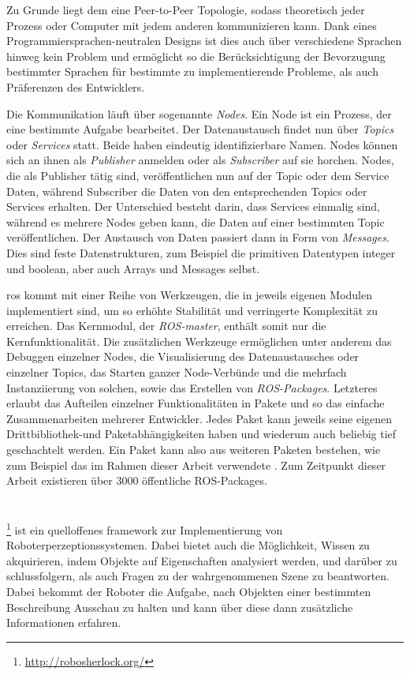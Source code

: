 Zu Grunde liegt dem eine Peer-to-Peer Topologie, sodass theoretisch jeder Prozess oder Computer mit jedem anderen kommunizieren kann. Dank eines Programmiersprachen-neutralen Designs ist dies auch über verschiedene Sprachen hinweg kein Problem und ermöglicht so die Berücksichtigung der Bevorzugung bestimmter Sprachen für bestimmte zu implementierende Probleme, als auch Präferenzen des Entwicklers.\par

Die Kommunikation läuft über sogenannte \textit{Nodes}. Ein Node ist ein Prozess, der eine bestimmte Aufgabe bearbeitet. Der Datenaustausch findet nun über \textit{Topics} oder \textit{Services} statt. Beide haben eindeutig identifizierbare Namen. Nodes können sich an ihnen als \textit{Publisher} anmelden oder als \textit{Subscriber} auf sie horchen. Nodes, die als Publisher tätig sind, veröffentlichen nun auf der Topic oder dem Service Daten, während Subscriber die Daten von den entsprechenden Topics oder Services erhalten. Der Unterschied besteht darin, dass Services einmalig sind, während es mehrere Nodes geben kann, die Daten auf einer bestimmten Topic veröffentlichen. Der Austausch von Daten passiert dann in Form von \textit{Messages}. Dies sind feste Datenstrukturen, zum Beispiel die primitiven Datentypen integer und boolean, aber auch Arrays und Messages selbst. \par

\gls{ros} kommt mit einer Reihe von Werkzeugen, die in jeweils eigenen Modulen implementiert sind, um so erhöhte Stabilität und verringerte Komplexität zu erreichen. Das Kernmodul, der \textit{ROS-master}, enthält somit nur die Kernfunktionalität. Die zusätzlichen Werkzeuge ermöglichen unter anderem das Debuggen einzelner Nodes, die Visualisierung des Datenaustausches oder einzelner Topics, das Starten ganzer Node-Verbünde und die mehrfach Instanziierung von solchen, sowie das Erstellen von \textit{ROS-Packages}. Letzteres erlaubt das Aufteilen einzelner Funktionalitäten in Pakete und so das einfache Zusammenarbeiten mehrerer Entwickler. Jedes Paket kann jeweils seine eigenen Drittbibliothek-und Paketabhängigkeiten haben und wiederum auch beliebig tief geschachtelt werden. Ein Paket kann also aus weiteren Paketen bestehen, wie zum Beispiel das im Rahmen dieser Arbeit verwendete \robosherlock. Zum Zeitpunkt dieser Arbeit existieren über 3000 öffentliche ROS-Packages.   

\section{\robosherlock}
\label{sec:robosherlock}
\robosherlock\footnote{\url{http://robosherlock.org/}} ist ein quelloffenes \gls{framework} zur Implementierung von Roboterperzeptionssystemen. Dabei bietet \robosherlock auch die Möglichkeit, Wissen zu akquirieren, indem Objekte auf Eigenschaften analysiert werden, und darüber zu schlussfolgern, als auch Fragen zu der wahrgenommenen Szene zu beantworten. Dabei bekommt der Roboter die Aufgabe, nach Objekten einer bestimmten Beschreibung Ausschau zu halten und kann über diese dann zusätzliche Informationen erfahren. \cite{robosherlock}\par

